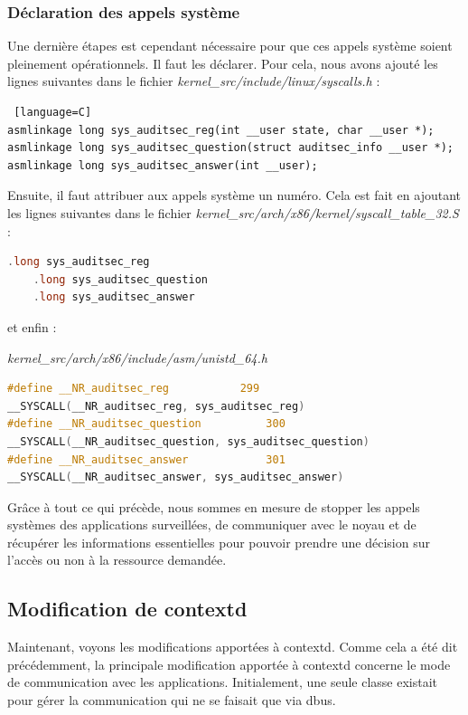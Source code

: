 \documentclass[pdftex,a4paper,titlepage,11pt]{article}
\begin{document}
\subsubsection{Déclaration des appels système}

Une dernière étapes est cependant nécessaire pour que ces appels système soient pleinement opérationnels. Il faut les déclarer. Pour cela, nous avons ajouté les lignes suivantes dans le fichier \textit{{kernel\_src}/include/linux/syscalls.h} :
\begin{lstlisting} [language=C]
asmlinkage long sys_auditsec_reg(int __user state, char __user *);
asmlinkage long sys_auditsec_question(struct auditsec_info __user *);
asmlinkage long sys_auditsec_answer(int __user);
\end{lstlisting}

Ensuite, il faut attribuer aux appels système un numéro. Cela est fait en ajoutant les lignes suivantes dans le fichier \textit{{kernel\_src}/arch/x86/kernel/syscall\_table\_32.S} : %

\begin{lstlisting}[language=C]
	.long sys_auditsec_reg
	.long sys_auditsec_question
	.long sys_auditsec_answer
\end{lstlisting}

et enfin :

\textit{{kernel\_src}/arch/x86/include/asm/unistd\_64.h}
\begin{lstlisting}[language=C]
#define __NR_auditsec_reg			299
__SYSCALL(__NR_auditsec_reg, sys_auditsec_reg)
#define __NR_auditsec_question			300
__SYSCALL(__NR_auditsec_question, sys_auditsec_question)
#define __NR_auditsec_answer			301
__SYSCALL(__NR_auditsec_answer, sys_auditsec_answer)
\end{lstlisting}

Grâce à tout ce qui précède, nous sommes en mesure de stopper les appels systèmes des applications surveillées, de communiquer avec le noyau et de récupérer les informations essentielles pour pouvoir prendre une décision sur l'accès ou non à la ressource demandée.

\subsection{Modification de contextd}

Maintenant, voyons les modifications apportées à contextd. Comme cela a été dit précédemment, la principale modification apportée à contextd concerne le mode de communication avec les applications. Initialement, une seule classe existait pour gérer la communication qui ne se faisait que via dbus.
\end{document}
